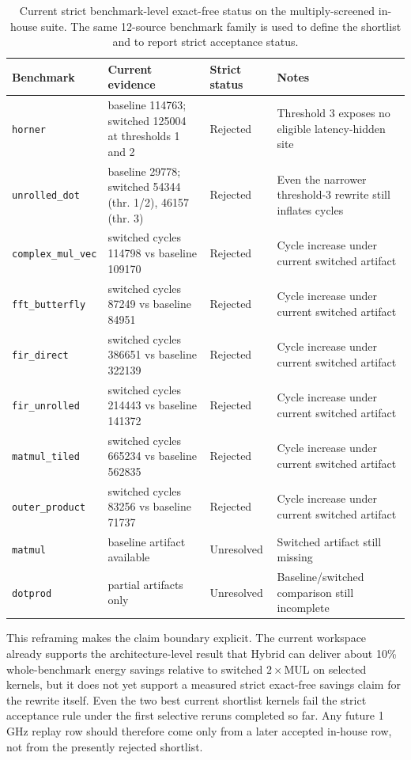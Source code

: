 \begin{table}[t]
\centering
\caption{Current strict benchmark-level exact-free status on the multiply-screened in-house suite. The same 12-source benchmark family is used to define the shortlist and to report strict acceptance status.}
\label{tab:hybrid_mul_only_vs_latency_hidden_100mhz}
\small
\begin{tabular}{llll}
\toprule
Benchmark & Current evidence & Strict status & Notes \\
\midrule
\texttt{horner} & baseline 114763; switched 125004 at thresholds 1 and 2 & Rejected & Threshold 3 exposes no eligible latency-hidden site \\
\texttt{unrolled\_dot} & baseline 29778; switched 54344 (thr. 1/2), 46157 (thr. 3) & Rejected & Even the narrower threshold-3 rewrite still inflates cycles \\
\texttt{complex\_mul\_vec} & switched cycles 114798 vs baseline 109170 & Rejected & Cycle increase under current switched artifact \\
\texttt{fft\_butterfly} & switched cycles 87249 vs baseline 84951 & Rejected & Cycle increase under current switched artifact \\
\texttt{fir\_direct} & switched cycles 386651 vs baseline 322139 & Rejected & Cycle increase under current switched artifact \\
\texttt{fir\_unrolled} & switched cycles 214443 vs baseline 141372 & Rejected & Cycle increase under current switched artifact \\
\texttt{matmul\_tiled} & switched cycles 665234 vs baseline 562835 & Rejected & Cycle increase under current switched artifact \\
\texttt{outer\_product} & switched cycles 83256 vs baseline 71737 & Rejected & Cycle increase under current switched artifact \\
\texttt{matmul} & baseline artifact available & Unresolved & Switched artifact still missing \\
\texttt{dotprod} & partial artifacts only & Unresolved & Baseline/switched comparison still incomplete \\
\bottomrule
\end{tabular}
\end{table}

This reframing makes the claim boundary explicit. The current workspace
already supports the architecture-level result that Hybrid can deliver
about 10\% whole-benchmark energy savings relative to switched
$2\!\times\!$MUL on selected kernels, but it does not yet support a
measured strict exact-free savings claim for the rewrite itself. Even
the two best current shortlist kernels fail the strict acceptance rule
under the first selective reruns completed so far. Any future 1\,GHz
replay row should therefore come only from a later accepted in-house row,
not from the presently rejected shortlist.

